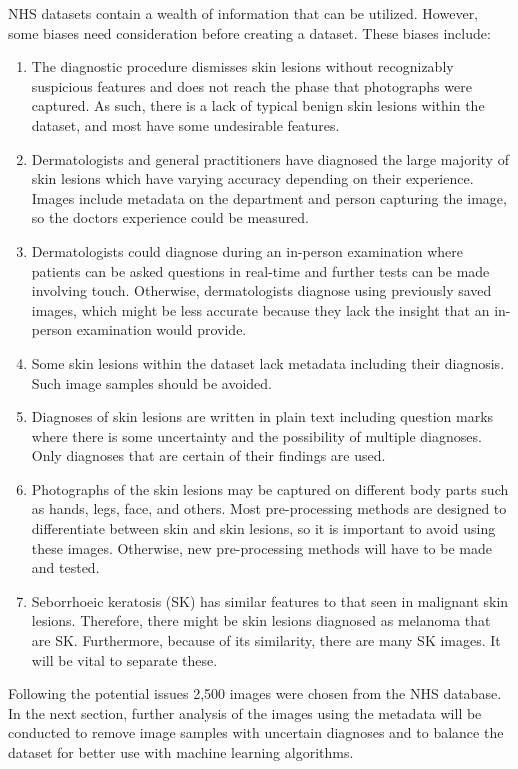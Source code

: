 NHS datasets contain a wealth of information that can be utilized. However, some biases need consideration before creating a dataset. These biases include:
\begin{enumerate}
    \item The diagnostic procedure dismisses skin lesions without recognizably suspicious features and does not reach the phase that photographs were captured. As such, there is a lack of typical benign skin lesions within the dataset, and most have some undesirable features.
    \item Dermatologists and general practitioners have diagnosed the large majority of skin lesions which have varying accuracy depending on their experience. Images include metadata on the department and person capturing the image, so the doctors experience could be measured.
    \item Dermatologists could diagnose during an in-person examination where patients can be asked questions in real-time and further tests can be made involving touch. Otherwise, dermatologists diagnose using previously saved images, which might be less accurate because they lack the insight that an in-person examination would provide.
    \item Some skin lesions within the dataset lack metadata including their diagnosis. Such image samples should be avoided.
    \item Diagnoses of skin lesions are written in plain text including question marks where there is some uncertainty and the possibility of multiple diagnoses. Only diagnoses that are certain of their findings are used.
    \item Photographs of the skin lesions may be captured on different body parts such as hands, legs, face, and others. Most pre-processing methods are designed to differentiate between skin and skin lesions, so it is important to avoid using these images. Otherwise, new pre-processing methods will have to be made and tested.
    \item Seborrhoeic keratosis (SK) has similar features to that seen in malignant skin lesions. Therefore, there might be skin lesions diagnosed as melanoma that are SK. Furthermore, because of its similarity, there are many SK images. It will be vital to separate these.
\end{enumerate}

Following the potential issues 2,500 images were chosen from the NHS database. In the next section, further analysis of the images using the metadata will be conducted to remove image samples with uncertain diagnoses and to balance the dataset for better use with machine learning algorithms.

